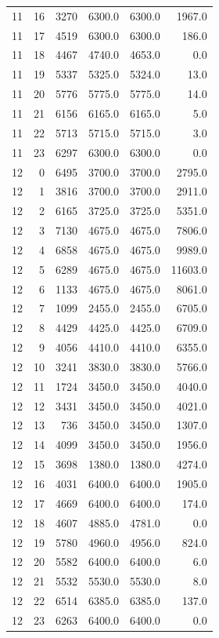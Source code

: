 \begin{longtable}{rrrrrr}
11 & 16 & 3270 & 6300.0 & 6300.0 & 1967.0\\
11 & 17 & 4519 & 6300.0 & 6300.0 & 186.0\\
11 & 18 & 4467 & 4740.0 & 4653.0 & 0.0\\
11 & 19 & 5337 & 5325.0 & 5324.0 & 13.0\\
11 & 20 & 5776 & 5775.0 & 5775.0 & 14.0\\
11 & 21 & 6156 & 6165.0 & 6165.0 & 5.0\\
11 & 22 & 5713 & 5715.0 & 5715.0 & 3.0\\
11 & 23 & 6297 & 6300.0 & 6300.0 & 0.0\\
12 & 0 & 6495 & 3700.0 & 3700.0 & 2795.0\\
12 & 1 & 3816 & 3700.0 & 3700.0 & 2911.0\\
12 & 2 & 6165 & 3725.0 & 3725.0 & 5351.0\\
12 & 3 & 7130 & 4675.0 & 4675.0 & 7806.0\\
12 & 4 & 6858 & 4675.0 & 4675.0 & 9989.0\\
12 & 5 & 6289 & 4675.0 & 4675.0 & 11603.0\\
12 & 6 & 1133 & 4675.0 & 4675.0 & 8061.0\\
12 & 7 & 1099 & 2455.0 & 2455.0 & 6705.0\\
12 & 8 & 4429 & 4425.0 & 4425.0 & 6709.0\\
12 & 9 & 4056 & 4410.0 & 4410.0 & 6355.0\\
12 & 10 & 3241 & 3830.0 & 3830.0 & 5766.0\\
12 & 11 & 1724 & 3450.0 & 3450.0 & 4040.0\\
12 & 12 & 3431 & 3450.0 & 3450.0 & 4021.0\\
12 & 13 & 736 & 3450.0 & 3450.0 & 1307.0\\
12 & 14 & 4099 & 3450.0 & 3450.0 & 1956.0\\
12 & 15 & 3698 & 1380.0 & 1380.0 & 4274.0\\
12 & 16 & 4031 & 6400.0 & 6400.0 & 1905.0\\
12 & 17 & 4669 & 6400.0 & 6400.0 & 174.0\\
12 & 18 & 4607 & 4885.0 & 4781.0 & 0.0\\
12 & 19 & 5780 & 4960.0 & 4956.0 & 824.0\\
12 & 20 & 5582 & 6400.0 & 6400.0 & 6.0\\
12 & 21 & 5532 & 5530.0 & 5530.0 & 8.0\\
12 & 22 & 6514 & 6385.0 & 6385.0 & 137.0\\
12 & 23 & 6263 & 6400.0 & 6400.0 & 0.0\\

\end{longtable}
